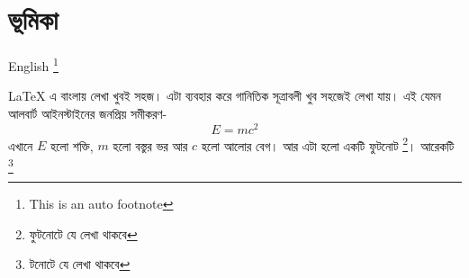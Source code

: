 \documentclass{article}
\begin{document}
\section*{ভূমিকা}


English \footnote{This is an auto footnote}

LaTeX এ বাংলায় লেখা খুবই সহজ। এটা ব্যবহার করে গানিতিক সূত্রাবলী খুব সহজেই লেখা যায়। 
 এই যেমন আলবার্ট আইনস্টাইনের জনপ্রিয় সমীকরণ-
\begin{equation}
E=mc^2
\end{equation} 
এখানে $E$ হলো শক্তি, $m$ হলো বস্তুর ভর আর $c$ হলো আলোর বেগ। আর এটা হলো একটি ফুটনোট \footnote[2]{ফুটনোটে যে লেখা থাকবে}। আরেকটি \footnote{টনোটে যে লেখা থাকবে}
\end{document}
